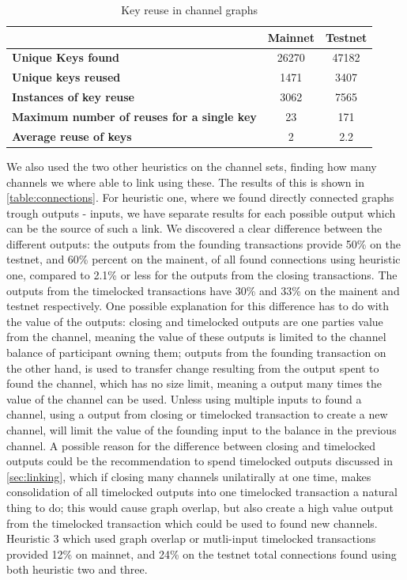 \begin{table}[ht]
\centering
\caption{Key reuse in channel graphs}
\label{key_reuse_table}
\begin{tabular}{|l|c|c|}
\hline
                                                   & \textbf{Mainnet} & \textbf{Testnet} \\ \hline
\textbf{Unique Keys found}                         & 26270          & 47182            \\ \hline
\textbf{Unique keys reused}                        & 1471               & 3407             \\ \hline
\textbf{Instances of key reuse}                    & 3062             & 7565             \\ \hline
\textbf{Maximum number of reuses for a single key} & 23               & 171              \\ \hline
\textbf{Average reuse of keys}                     & 2              & 2.2              \\ \hline
\end{tabular}
\end{table}

We also used the two other heuristics on the channel sets, finding how many channels we where able to link using these. The results of this is shown in \cref{table:connections}. For heuristic one, where we found directly connected graphs trough outputs - inputs, we have separate results for each possible output which can be the source of such a link. We discovered a clear difference between the different outputs: the outputs from the founding transactions provide 50\% on the testnet, and 60\% percent on the mainent, of all found connections using heuristic one, compared to 2.1\% or less for the outputs from the closing transactions. The outputs from the timelocked transactions have 30\% and 33\% on the mainent and testnet respectively. One possible explanation for this difference has to do with the value of the outputs: closing and timelocked outputs are one parties value from the channel, meaning the value of these outputs is limited to the channel balance of participant owning them; outputs from the founding transaction on the other hand, is used to transfer change resulting from the output spent to found the channel, which has no size limit, meaning a output many times the value of the channel can be used. Unless using multiple inputs to found a channel, using a output from closing or timelocked transaction to create a new channel, will limit the value of the founding input to the balance in the previous channel. A possible reason for the difference between closing and timelocked outputs could be the recommendation to spend timelocked outputs discussed in \cref{sec:linking}, which if closing many channels unilatirally at one time, makes consolidation of all timelocked outputs into one timelocked transaction a natural thing to do; this would cause graph overlap, but also create a high value output from the timelocked transaction which could be used to found new channels. Heuristic 3 which used graph overlap or mutli-input timelocked transactions provided 12\% on mainnet, and 24\% on the testnet total connections found using both heuristic two and three.

